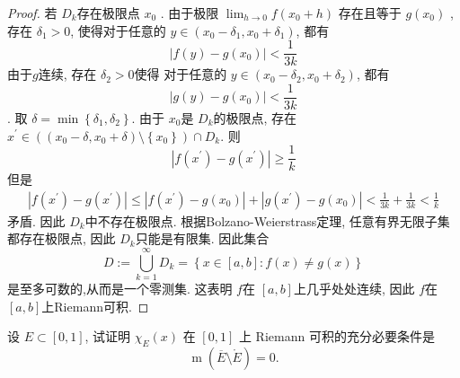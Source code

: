 \documentclass[../main.tex]{subfiles}
\begin{document}
\begin{proof}
    若 \(  D_{k}  \)存在极限点 \( x_0  \) . 由于极限 \(  \lim_{h\to 0}f\left( x_0+ h \right)   \)  存在且等于 \(  g\left( x_0 \right)   \) , 存在 \(   \delta_1 > 0  \), 使得对于任意的 \(  y\in \left( x_0- \delta _1 ,x_0+  \delta _1  \right)   \), 都有 \[
    \left| f\left( y \right)-g\left( x_0 \right)   \right|< \frac{1 }{3k }  
    \]由于\(  g  \)连续, 存在 \(   \delta _2 > 0  \)使得 对于任意的 \(  y\in \left( x_0- \delta _2 ,x_0+  \delta_2  \right)   \), 都有 \[
    \left| g\left( y \right)-g\left( x_0 \right)   \right|< \frac{1 }{3k }  
    \]   . 取 \(   \delta = \min \left\{  \delta _1 , \delta _2  \right\}  \).  由于 \(  x_0  \)是 \(  D_{k}  \)的极限点, 存在 \(  x^{\prime} \in\left(  \left( x_0- \delta ,x_0+  \delta  \right)\setminus \left\{ x_0 \right\} \right) \cap D_{k}   \). 则 \[
    \left| f\left( x^{\prime}  \right)-g\left( x^{\prime}  \right)   \right|\ge \frac{1 }{k }  
    \] 但是\begin{equation}
        \begin{aligned}
            \left| f\left( x^{\prime}  \right)-g\left( x^{\prime}  \right)   \right|\le \left| f\left( x^{\prime}  \right)-g\left( x_0 \right)   \right|+   \left| g\left( x^{\prime}  \right)-g\left( x_0 \right)   \right|< \frac{1 }{3k }+   \frac{1 }{3k }< \frac{1 }{k }  
        \end{aligned}
    \end{equation}  矛盾. 因此 \(  D_{k}  \)中不存在极限点. 根据Bolzano-Weierstrass定理, 任意有界无限子集都存在极限点, 因此 \(  D_{k}  \)只能是有限集. 因此集合 \[
    D:= \bigcup _{k= 1}^{\infty}D_{k}= \left\{ x\in \left[ a,b \right]: f\left( x \right)\neq  g\left( x \right)    \right\}
    \]是至多可数的,从而是一个零测集. 这表明 \(  f  \)在 \(  \left[ a,b \right]   \)上几乎处处连续, 因此 \(  f  \)在 \(  \left[ a,b \right]   \)上Riemann可积.    
\end{proof}
\begin{exercise}{}{}
设 $E\subset[0,1]$, 试证明 $\chi_{E}(x)$ 在 $[0,1]$ 上 Riemann 可积的充分必要条件是
\[\operatorname{m}(\overline{E}\setminus\mathring{E})=0.\]
\end{exercise}
\end{document}
